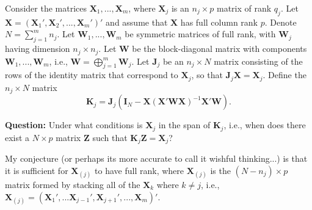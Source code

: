 \documentclass{article}\usepackage[]{graphicx}\usepackage[]{color}
\newcommand{\bm}{\mathbf}
\begin{document}
\def\spacingset#1{\renewcommand{\baselinestretch}%
{#1}\small\normalsize} \spacingset{1}

Consider the matrices $\bm{X}_1,...,\bm{X}_m$, where $\bm{X}_j$ is an $n_j \times p$ matrix of rank $q_j$. Let $\bm{X} = \left(\bm{X}_1', \bm{X}_2',...,\bm{X}_m'\right)'$ and assume that $\bm{X}$ has full column rank $p$. Denote $N = \sum_{j=1}^m n_j$. Let $\bm{W}_1,...,\bm{W}_m$ be symmetric matrices of full rank, with $\bm{W}_j$ having dimension $n_j \times n_j$. Let $\bm{W}$ be the block-diagonal matrix with components $\bm{W}_1,...,\bm{W}_m$, i.e., $\bm{W}  = \bigoplus_{j=1}^m \bm{W}_j$. Let $\bm{J}_j$ be an $n_j \times N$ matrix consisting of the rows of the identity matrix that correspond to $\bm{X}_j$, so that $\bm{J}_j\bm{X} = \bm{X}_j$. Define the $n_j \times N$ matrix \[
\bm{K}_j = \bm{J}_j \left(\bm{I}_N - \bm{X}\left(\bm{X}'\bm{W}\bm{X}\right)^{-1}\bm{X}'\bm{W}\right). \]

\textbf{Question:} Under what conditions is $\bm{X}_j$ in the span of $\bm{K}_j$, i.e., when does there exist a $N \times p$ matrix $\bm{Z}$ such that $\bm{K}_j \bm{Z} = \bm{X}_j$? 

My conjecture (or perhaps its more accurate to call it wishful thinking...) is that it is sufficient for $\bm{X}_{(j)}$ to have full rank, where $\bm{X}_{(j)}$ is the $\left(N - n_j\right) \times p$ matrix formed by stacking all of the $\bm{X}_k$ where $k \neq j$, i.e., $\bm{X}_{(j)} = \left(\bm{X}_1',...\bm{X}_{j-1}',\bm{X}_{j+1}',...,\bm{X}_m\right)'$.
\end{document}
